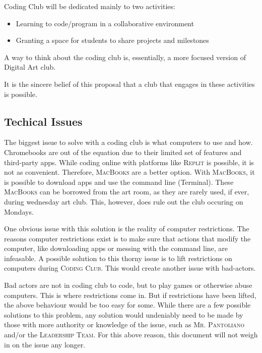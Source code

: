 \documentclass{report}
\begin{document}
            Coding Club will be dedicated mainly to two activities:
            \begin{itemize}
                \item Learning to code/program in a collaborative environment
                \item Granting a space for students to share projects and milestones
            \end{itemize}

            A way to think about the coding club is, essentially, a more focused version of Digital Art club.

            It is the sincere belief of this proposal that a club that engages in these activities is possible.

        \subsection{Techical Issues}

            The biggest issue to solve with a coding club is what computers to use and how. Chromebooks are out of the equation due to their limited set of features and third-party apps. While coding online with platforms like \textsc{Replit} is possible, it is not as convenient. Therefore, \textsc{MacBooks} are a better option. With \textsc{MacBooks}, it is possible to download apps and use the command line (Terminal). These \textsc{MacBooks} can be borrowed from the art room, as they are rarely used, if ever, during wednesday art club. This, however, does rule out the club occuring on Mondays.

            One obvious issue with this solution is the reality of computer restrictions. The reasons computer restrictions exist is to make sure that actions that modify the computer, like downloading apps or messing with the command line, are infeasable. A possible solution to this thorny issue is to lift restrictions on computers during \textsc{Coding Club}. This would create another issue with bad-actors.

            Bad actors are not in coding club to code, but to play games or otherwise abuse computers. This is where restrictions come in. But if restrictions have been lifted, the above behaviour would be too easy for some. While there are a few possible solutions to this problem, any solution would undeniably need to be made by those with more authority or knowledge of the issue, such as \textsc{Mr. Pantoliano} and/or the \textsc{Leadership Team}. For this above reason, this document will not weigh in on the issue any longer.
\end{document}
